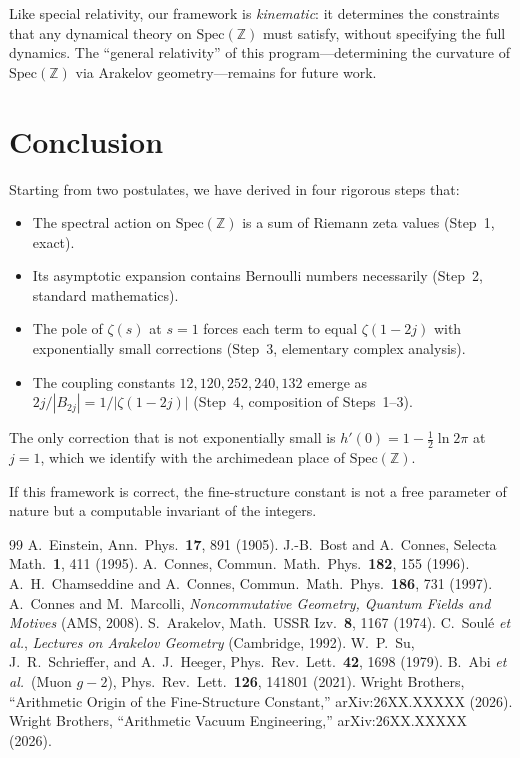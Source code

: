 \documentclass[aps,prl,twocolumn,superscriptaddress,nofootinbib]{revtex4-2}
\newcommand{\Spec}{\mathrm{Spec}}
\begin{document}
Like special relativity, our framework is \emph{kinematic}: it
determines the constraints that any dynamical theory on
$\Spec(\mathbb{Z})$ must satisfy, without specifying the full
dynamics.  The ``general relativity'' of this program---determining
the curvature of $\Spec(\mathbb{Z})$ via Arakelov
geometry---remains for future work.

\section{Conclusion}

Starting from two postulates, we have derived in four rigorous steps
that:
\begin{itemize}
\item The spectral action on $\Spec(\mathbb{Z})$ is a sum of
Riemann zeta values (Step~1, exact).
\item Its asymptotic expansion contains Bernoulli numbers
necessarily (Step~2, standard mathematics).
\item The pole of $\zeta(s)$ at $s=1$ forces each term to equal
$\zeta(1{-}2j)$ with exponentially small corrections (Step~3,
elementary complex analysis).
\item The coupling constants $12, 120, 252, 240, 132$ emerge as
$2j/|B_{2j}|=1/|\zeta(1{-}2j)|$ (Step~4, composition of
Steps~1--3).
\end{itemize}

The only correction that is not exponentially small is
$h'(0)=1-\frac{1}{2}\ln 2\pi$ at $j=1$, which we identify with
the archimedean place of $\Spec(\mathbb{Z})$.

If this framework is correct, the fine-structure constant is not a
free parameter of nature but a computable invariant of the integers.

\begin{thebibliography}{99}
 A.~Einstein, Ann.\ Phys.\ \textbf{17}, 891 (1905).
 J.-B.~Bost and A.~Connes, Selecta Math.\ \textbf{1}, 411 (1995).
 A.~Connes, Commun.\ Math.\ Phys.\ \textbf{182}, 155 (1996).
 A.~H.~Chamseddine and A.~Connes, Commun.\ Math.\ Phys.\ \textbf{186}, 731 (1997).
 A.~Connes and M.~Marcolli, \textit{Noncommutative Geometry, Quantum Fields and Motives} (AMS, 2008).
 S.~Arakelov, Math.\ USSR Izv.\ \textbf{8}, 1167 (1974).
 C.~Soul\'e \textit{et al.}, \textit{Lectures on Arakelov Geometry} (Cambridge, 1992).
 W.~P.~Su, J.~R.~Schrieffer, and A.~J.~Heeger, Phys.\ Rev.\ Lett.\ \textbf{42}, 1698 (1979).
 B.~Abi \textit{et al.}\ (Muon $g{-}2$), Phys.\ Rev.\ Lett.\ \textbf{126}, 141801 (2021).
 Wright Brothers, ``Arithmetic Origin of the Fine-Structure Constant,'' arXiv:26XX.XXXXX (2026).
 Wright Brothers, ``Arithmetic Vacuum Engineering,'' arXiv:26XX.XXXXX (2026).
\end{thebibliography}
\end{document}
